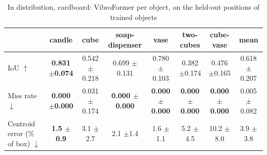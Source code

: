 \begin{table}
\caption{In distribution, cardboard: VibroFormer per object, on the held-out positions of trained objects}
\label{tab:id_cardboard}
\begin{tabular}{l!{\vrule width 1.2pt}cccccc!{\vrule width 1.2pt}c}
\toprule
 & candle & cube & soap-dispenser & vase & two-cubes & cube-vase & mean \\
\midrule
IoU $\uparrow$ & \bfseries 0.831 {\scriptsize $\pm$0.074} & 0.542 {\scriptsize $\pm$0.218} & 0.699 {\scriptsize $\pm$0.131} & 0.780 {\scriptsize $\pm$0.103} & 0.382 {\scriptsize $\pm$0.174} & 0.476 {\scriptsize $\pm$0.165} & 0.618 {\scriptsize $\pm$0.207} \\
Miss rate $\downarrow$ & \bfseries 0.000 {\scriptsize $\pm$0.000} & 0.031 {\scriptsize $\pm$0.174} & \bfseries 0.000 {\scriptsize $\pm$0.000} & \bfseries 0.000 {\scriptsize $\pm$0.000} & \bfseries 0.000 {\scriptsize $\pm$0.000} & \bfseries 0.000 {\scriptsize $\pm$0.000} & 0.005 {\scriptsize $\pm$0.082} \\
Centroid error (\% of box) $\downarrow$ & \bfseries 1.5 {\scriptsize $\pm$0.9} & 3.1 {\scriptsize $\pm$2.7} & 2.1 {\scriptsize $\pm$1.4} & 1.6 {\scriptsize $\pm$1.1} & 5.2 {\scriptsize $\pm$4.5} & 10.2 {\scriptsize $\pm$8.0} & 3.9 {\scriptsize $\pm$3.8} \\
\bottomrule
\end{tabular}
\end{table}
